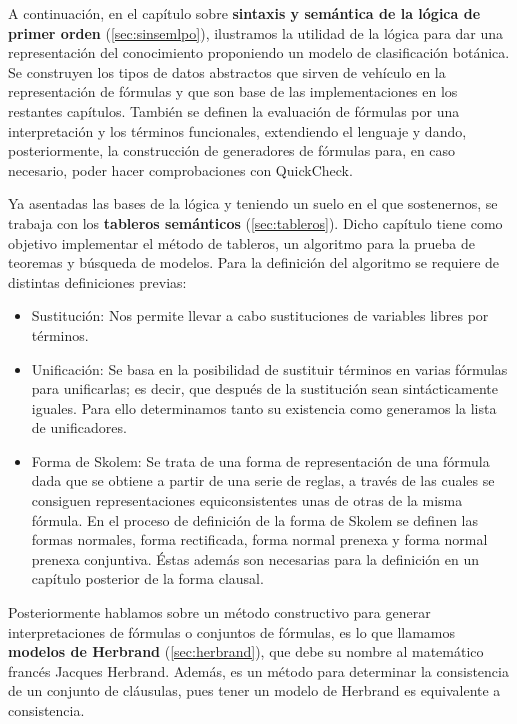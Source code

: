 A continuación, en el capítulo sobre \textbf{sintaxis y semántica de la lógica
de primer orden} (\ref{sec:sinsemlpo}), ilustramos la utilidad de la lógica
para dar una representación del conocimiento proponiendo un modelo de
clasificación botánica. Se construyen los tipos de datos abstractos que sirven
de vehículo en la representación de fórmulas y que son base de las
implementaciones en los restantes capítulos. También se definen la evaluación
de fórmulas por una interpretación y los términos funcionales, extendiendo el
lenguaje y dando, posteriormente, la construcción de generadores de fórmulas
para, en caso necesario, poder hacer comprobaciones con QuickCheck.

Ya asentadas las bases de la lógica y teniendo un suelo en el que sostenernos,
se trabaja con los \textbf{tableros semánticos} (\ref{sec:tableros}). Dicho
capítulo tiene como objetivo implementar el método de tableros, un algoritmo
para la prueba de teoremas y búsqueda de modelos. Para la definición del
algoritmo se requiere de distintas definiciones previas:

\begin{itemize}
\item Sustitución: Nos permite llevar a cabo sustituciones de variables libres
  por términos.
\item Unificación: Se basa en la posibilidad de sustituir términos en varias
  fórmulas para unificarlas; es decir, que después de la sustitución sean
  sintácticamente iguales. Para ello determinamos tanto su existencia como
  generamos la lista de unificadores.
\item Forma de Skolem: Se trata de una forma de representación de una fórmula
  dada que se obtiene a partir de una serie de reglas, a través de las cuales
  se consiguen representaciones equiconsistentes unas de otras de la misma
  fórmula. En el proceso de definición de la forma de Skolem se definen las
  formas normales, forma rectificada, forma normal prenexa y forma normal
  prenexa conjuntiva. Éstas además son necesarias para la definición en un
  capítulo posterior de la forma clausal.
\end{itemize}

Posteriormente hablamos sobre un método constructivo para generar
interpretaciones de fórmulas o conjuntos de fórmulas, es lo que llamamos
\textbf{modelos de Herbrand} (\ref{sec:herbrand}), que debe su nombre al
matemático francés Jacques Herbrand. Además, es un método para determinar la
consistencia de un conjunto de cláusulas, pues tener un modelo de Herbrand es
equivalente a consistencia.

